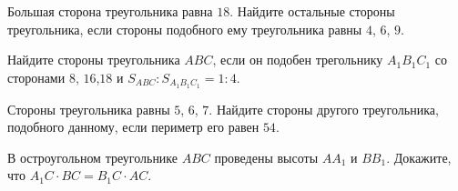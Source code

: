 \begin{homework}[number=2]
	\begin{listofex}
		\item  Большая сторона треугольника равна \( 18 \). Найдите остальные стороны треугольника, если стороны подобного ему треугольника равны \( 4 \), \( 6 \), \( 9 \).
		\item Найдите стороны треугольника \( ABC \), если он подобен трегольнику \( A_1B_1C_1 \) со сторонами \( 8 \), \( 16 \),\( 18 \) и \( S_{ABC}:S_{A_1B_1C_1}=1:4 \).
		\item Стороны треугольника равны \( 5 \), \( 6 \), \( 7 \). Найдите стороны другого треугольника, подобного данному, если периметр его равен \( 54 \).
		\item В остроугольном треугольнике \( ABC \) проведены высоты \( AA_1 \) и \( BB_1 \). Докажите, что  \( A_1C\cdot BC = B_1C\cdot AC \).
	\end{listofex}
\end{homework}

